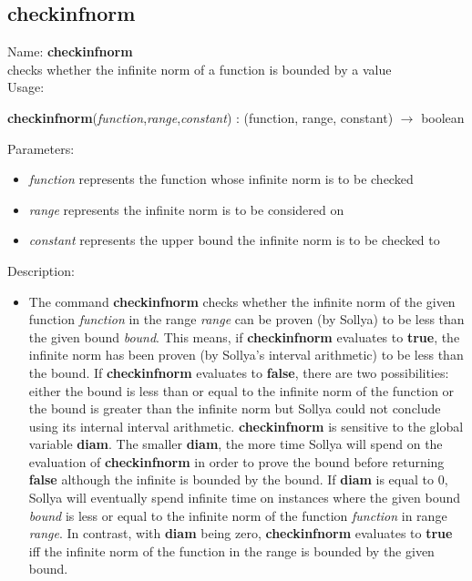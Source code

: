 \subsection{checkinfnorm}
\label{labcheckinfnorm}
\noindent Name: \textbf{checkinfnorm}\\
checks whether the infinite norm of a function is bounded by a value\\

\noindent Usage: 
\begin{center}
\textbf{checkinfnorm}(\emph{function},\emph{range},\emph{constant}) : (\textsf{function}, \textsf{range}, \textsf{constant}) $\rightarrow$ \textsf{boolean}\\
\end{center}
Parameters: 
\begin{itemize}
\item \emph{function} represents the function whose infinite norm is to be checked
\item \emph{range} represents the infinite norm is to be considered on
\item \emph{constant} represents the upper bound the infinite norm is to be checked to
\end{itemize}
\noindent Description: \begin{itemize}

\item The command \textbf{checkinfnorm} checks whether the infinite norm of the given
   function \emph{function} in the range \emph{range} can be proven (by Sollya) to
   be less than the given bound \emph{bound}. This means, if \textbf{checkinfnorm}
   evaluates to \textbf{true}, the infinite norm has been proven (by Sollya's
   interval arithmetic) to be less than the bound. If \textbf{checkinfnorm} evaluates
   to \textbf{false}, there are two possibilities: either the bound is less than
   or equal to the infinite norm of the function or the bound is greater
   than the infinite norm but Sollya could not conclude using its
   internal interval arithmetic.
   \textbf{checkinfnorm} is sensitive to the global variable \textbf{diam}. The smaller \textbf{diam},
   the more time Sollya will spend on the evaluation of \textbf{checkinfnorm} in
   order to prove the bound before returning \textbf{false} although the infinite
   is bounded by the bound. If \textbf{diam} is equal to $0$, Sollya will
   eventually spend infinite time on instances where the given bound
   \emph{bound} is less or equal to the infinite norm of the function
   \emph{function} in range \emph{range}. In contrast, with \textbf{diam} being zero,
   \textbf{checkinfnorm} evaluates to \textbf{true} iff the infinite norm of the function in
   the range is bounded by the given bound.
\end{itemize}
